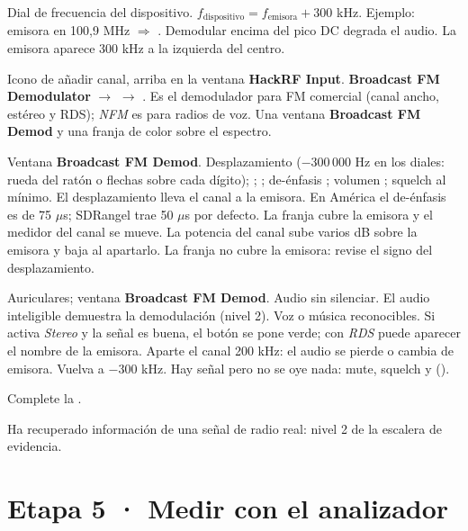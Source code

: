 {Dial de frecuencia del dispositivo.}
{$f_{\mathrm{dispositivo}} = f_{\mathrm{emisora}} + 300$ kHz. Ejemplo: emisora en 100,9 MHz $\Rightarrow$ .}
{Demodular encima del pico DC degrada el audio.}
{La emisora aparece 300 kHz a la izquierda del centro.}
{}
{}

{Icono de añadir canal, arriba en la ventana \textbf{HackRF Input}.}
{\textbf{Broadcast FM Demodulator} $\rightarrow$  $\rightarrow$ .}
{Es el demodulador para FM comercial (canal ancho, estéreo y RDS); \emph{NFM} es para radios de voz.}
{Una ventana \textbf{Broadcast FM Demod} y una franja de color sobre el espectro.}
{}
{}

{Ventana \textbf{Broadcast FM Demod}.}
{Desplazamiento  ($-300\,000$ Hz en los diales: rueda del ratón o flechas sobre cada dígito);  ;  ; de-énfasis ; volumen ; squelch al mínimo.}
{El desplazamiento lleva el canal a la emisora. En América el de-énfasis es de 75 $\mu$s; SDRangel trae 50 $\mu$s por defecto.}
{La franja cubre la emisora y el medidor del canal se mueve.}
{La potencia del canal sube varios dB sobre la emisora y baja al apartarlo.}
{La franja no cubre la emisora: revise el signo del desplazamiento.}

{Auriculares; ventana \textbf{Broadcast FM Demod}.}
{Audio sin silenciar.}
{El audio inteligible demuestra la demodulación (nivel 2).}
{Voz o música reconocibles. Si activa \emph{Stereo} y la señal es buena, el botón se pone verde; con \emph{RDS} puede aparecer el nombre de la emisora.}
{Aparte el canal 200 kHz: el audio se pierde o cambia de emisora. Vuelva a $-300$ kHz.}
{Hay señal pero no se oye nada: mute, squelch y  ().}

Complete la .


\begin{logro}
Ha recuperado información de una señal de radio real: nivel 2 de la escalera de evidencia.
\end{logro}

\section{Etapa 5 · Medir con el analizador}
\label{sec:w-siglent}

